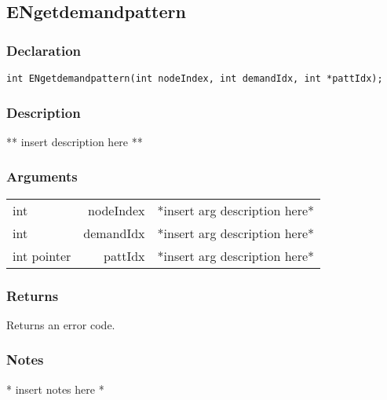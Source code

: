\subsection{ENgetdemandpattern}
\subsubsection{Declaration}
\begin{lstlisting}
int ENgetdemandpattern(int nodeIndex, int demandIdx, int *pattIdx);
\end{lstlisting}
\subsubsection{Description}
** insert description here **
\subsubsection{Arguments}
\begin{tabular}{l r p{11cm} }
int&nodeIndex&*insert arg description here* \\[6pt]
int&demandIdx&*insert arg description here* \\[6pt]
int pointer&pattIdx&*insert arg description here* \\[6pt]
\end{tabular}
\subsubsection{Returns}
Returns an error code.
\subsubsection{Notes}
* insert notes here *